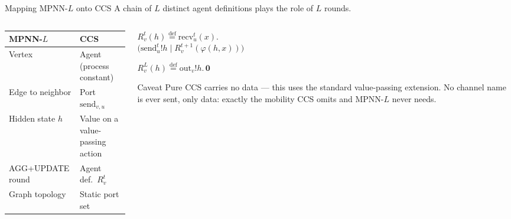 \documentclass[10pt,aspectratio=169,draft]{beamer}
\begin{document}
\begin{frame}{Mapping MPNN-$L$ onto CCS}
  A chain of $L$ distinct agent definitions plays the role of $L$ rounds.
  \vspace{0.1cm}
  \begin{columns}[T]
    \begin{column}{0.46\textwidth}
      \footnotesize
      \begin{tabular}{@{}p{2.5cm}p{3.0cm}@{}}
      \toprule
      \textbf{MPNN-$L$} & \textbf{CCS} \\
      \midrule
      Vertex & Agent (process constant) \\
      Edge to neighbor & Port $\mathrm{send}_{v,u}$ \\
      Hidden state $h$ & Value on a value-passing action \\
      AGG+UPDATE round & Agent def.\ $R_v^t$ \\
      Graph topology & Static port set \\
      \bottomrule
      \end{tabular}
    \end{column}
    \begin{column}{0.5\textwidth}
      \begin{exampleblock}{}
        \scriptsize
        $R_v^t(h) \stackrel{\mathrm{def}}{=} \mathrm{recv}_u^t(x).$\\
        \hspace*{0.6cm}$\bigl(\mathrm{send}_u^t!h \mid R_v^{t+1}(\varphi(h,x))\bigr)$

        \vspace{0.15cm}
        $R_v^L(h) \stackrel{\mathrm{def}}{=} \mathrm{out}_v!h.\,\mathbf{0}$
      \end{exampleblock}
      \begin{exampleblock}{Caveat}
        \footnotesize Pure CCS carries no data --- this uses the standard
        value-passing extension. No channel name is ever sent, only data:
        exactly the mobility CCS omits and MPNN-$L$ never needs.
      \end{exampleblock}
    \end{column}
  \end{columns}
  \vspace{0.15cm}
  {\footnotesize{}}
\end{frame}
\end{document}
